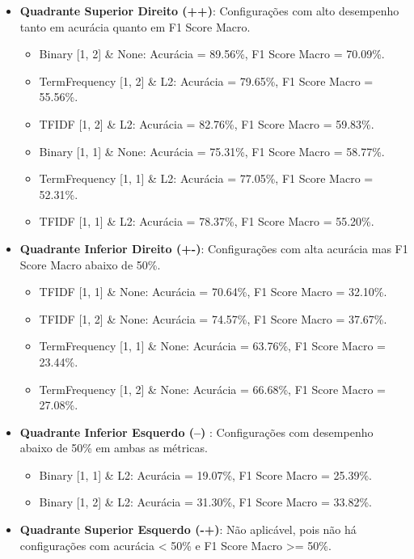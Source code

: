 \begin{itemize}
    \item \textbf{Quadrante Superior Direito (++)}: Configurações com alto desempenho tanto em acurácia quanto em F1 Score Macro.
    \begin{itemize}
        \item Binary [1, 2] \& None: Acurácia = 89.56\%, F1 Score Macro = 70.09\%.
        \item TermFrequency [1, 2] \& L2: Acurácia = 79.65\%, F1 Score Macro = 55.56\%.
        \item TFIDF [1, 2] \& L2: Acurácia = 82.76\%, F1 Score Macro = 59.83\%.
        \item Binary [1, 1] \& None: Acurácia = 75.31\%, F1 Score Macro = 58.77\%.
        \item TermFrequency [1, 1] \& L2: Acurácia = 77.05\%, F1 Score Macro = 52.31\%.
        \item TFIDF [1, 1] \& L2: Acurácia = 78.37\%, F1 Score Macro = 55.20\%.
    \end{itemize}

    \item \textbf{Quadrante Inferior Direito (+-)}: Configurações com alta acurácia mas F1 Score Macro abaixo de 50\%.
    \begin{itemize}
        \item TFIDF [1, 1] \& None: Acurácia = 70.64\%, F1 Score Macro = 32.10\%.
        \item TFIDF [1, 2] \& None: Acurácia = 74.57\%, F1 Score Macro = 37.67\%.
        \item TermFrequency [1, 1] \& None: Acurácia = 63.76\%, F1 Score Macro = 23.44\%.
        \item TermFrequency [1, 2] \& None: Acurácia = 66.68\%, F1 Score Macro = 27.08\%.
    \end{itemize}

    \item \textbf{Quadrante Inferior Esquerdo (--) }: Configurações com desempenho abaixo de 50\% em ambas as métricas.
    \begin{itemize}
        \item Binary [1, 1] \& L2: Acurácia = 19.07\%, F1 Score Macro = 25.39\%.
        \item Binary [1, 2] \& L2: Acurácia = 31.30\%, F1 Score Macro = 33.82\%.
    \end{itemize}

    \item \textbf{Quadrante Superior Esquerdo (-+)}: Não aplicável, pois não há configurações com acurácia < 50\% e F1 Score Macro >= 50\%.
\end{itemize}

